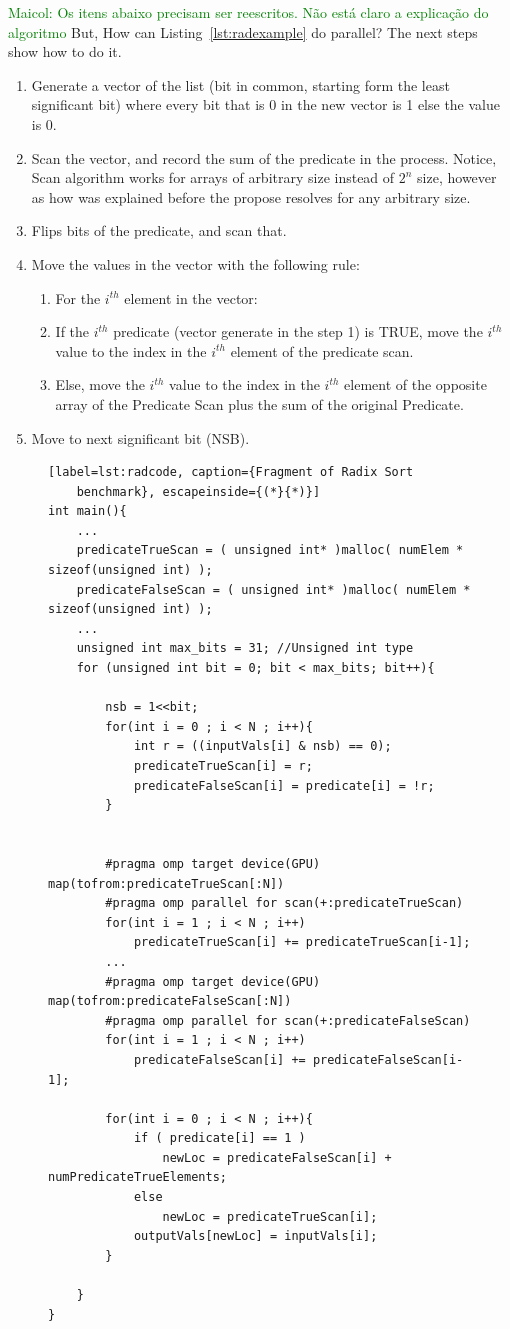 \documentclass[Ingles]{ic-tese-v1}
\newcommand{\marcio}[1]{\textcolor{green}{ {#1}}}
\newcommand{\marcio}[1]{}
\newcommand{\rlst}[1]{Listing~\ref{lst:#1}}
\begin{document}
\marcio{Maicol: Os itens abaixo precisam ser reescritos. Não está claro a explicação do algoritmo}
But, How can \rlst{radexample} do parallel?
The next steps show how to do it.
\begin{enumerate}
\item Generate a vector of the list (bit in common, starting form the least significant bit)
where every bit that is 0 in the new vector is 1 else the value is 0.
\item Scan the vector, and record the sum of the predicate in the process. Notice, Scan
algorithm works for arrays of arbitrary size instead of $2^{n}$ size, however as how was
explained before the propose resolves for any arbitrary size.
\item Flips bits of the predicate, and scan that.
\item Move the values in the vector with the following rule:
\begin{enumerate}
\item For the $i^{th}$ element in the vector:
\item If the $i^{th}$ predicate (vector generate in the step 1) is TRUE, move the $i^{th}$
value to the index in the $i^{th}$ element of the predicate scan.
\item Else, move the $i^{th}$ value to the index in the $i^{th}$ element of the opposite array
of the Predicate Scan plus the sum of the original Predicate.
\end{enumerate}
\item Move to next significant bit (NSB).
\end{enumerate}


\begin{figure}[t]
	\lstset{basicstyle=\scriptsize}
	\begin{lstlisting}[label=lst:radcode, caption={Fragment of Radix Sort
	benchmark}, escapeinside={(*}{*)}]
int main(){
	...
	predicateTrueScan = ( unsigned int* )malloc( numElem * sizeof(unsigned int) );
	predicateFalseScan = ( unsigned int* )malloc( numElem * sizeof(unsigned int) );
	...
	unsigned int max_bits = 31; //Unsigned int type
	for (unsigned int bit = 0; bit < max_bits; bit++){

		nsb = 1<<bit;
		for(int i = 0 ; i < N ; i++){
			int r = ((inputVals[i] & nsb) == 0);
			predicateTrueScan[i] = r;
			predicateFalseScan[i] = predicate[i] = !r;
		}


		#pragma omp target device(GPU) map(tofrom:predicateTrueScan[:N])
		#pragma omp parallel for scan(+:predicateTrueScan)
		for(int i = 1 ; i < N ; i++)
			predicateTrueScan[i] += predicateTrueScan[i-1];
		...
		#pragma omp target device(GPU) map(tofrom:predicateFalseScan[:N])
		#pragma omp parallel for scan(+:predicateFalseScan)
		for(int i = 1 ; i < N ; i++)
			predicateFalseScan[i] += predicateFalseScan[i-1];

		for(int i = 0 ; i < N ; i++){
			if ( predicate[i] == 1 )
				newLoc = predicateFalseScan[i] + numPredicateTrueElements;
			else
				newLoc = predicateTrueScan[i];
			outputVals[newLoc] = inputVals[i];
		}

	}
}
	\end{lstlisting}
\end{figure}
\end{document}
